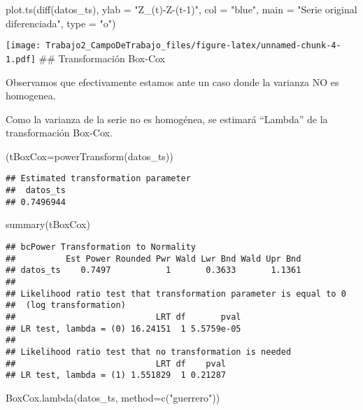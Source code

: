 \documentclass[
]{article}
\newenvironment{Shaded}{\begin{snugshade}}{\end{snugshade}}
\newcommand{\AttributeTok}[1]{\textcolor[rgb]{0.77,0.63,0.00}{#1}}
\newcommand{\FunctionTok}[1]{\textcolor[rgb]{0.00,0.00,0.00}{#1}}
\newcommand{\NormalTok}[1]{#1}
\newcommand{\StringTok}[1]{\textcolor[rgb]{0.31,0.60,0.02}{#1}}
\begin{document}
\begin{Shaded}
\begin{Highlighting}[]
\FunctionTok{plot.ts}\NormalTok{(}\FunctionTok{diff}\NormalTok{(datos\_ts), }\AttributeTok{ylab =} \StringTok{"Z\_(t){-}Z{-}(t{-}1)"}\NormalTok{, }\AttributeTok{col =} \StringTok{"blue"}\NormalTok{, }
        \AttributeTok{main =} \StringTok{"Serie original diferenciada"}\NormalTok{, }\AttributeTok{type =} \StringTok{"o"}\NormalTok{)}
\end{Highlighting}
\end{Shaded}

\texttt{[image: Trabajo2\_CampoDeTrabajo\_files/figure-latex/unnamed-chunk-4-1.pdf]}
\#\# Transformación Box-Cox

Observamos que efectivamente estamos ante un caso donde la varianza NO
es homogenea.

Como la varianza de la serie no es homogénea, se estimará ``Lambda'' de
la transformación Box-Cox.

\begin{Shaded}
\begin{Highlighting}[]
\NormalTok{(}\AttributeTok{tBoxCox=}\FunctionTok{powerTransform}\NormalTok{(datos\_ts))}
\end{Highlighting}
\end{Shaded}

\begin{verbatim}
## Estimated transformation parameter 
##  datos_ts 
## 0.7496944
\end{verbatim}

\begin{Shaded}
\begin{Highlighting}[]
\FunctionTok{summary}\NormalTok{(tBoxCox)}
\end{Highlighting}
\end{Shaded}

\begin{verbatim}
## bcPower Transformation to Normality 
##          Est Power Rounded Pwr Wald Lwr Bnd Wald Upr Bnd
## datos_ts    0.7497           1       0.3633       1.1361
## 
## Likelihood ratio test that transformation parameter is equal to 0
##  (log transformation)
##                            LRT df       pval
## LR test, lambda = (0) 16.24151  1 5.5759e-05
## 
## Likelihood ratio test that no transformation is needed
##                            LRT df    pval
## LR test, lambda = (1) 1.551829  1 0.21287
\end{verbatim}

\begin{Shaded}
\begin{Highlighting}[]
\FunctionTok{BoxCox.lambda}\NormalTok{(datos\_ts, }\AttributeTok{method=}\FunctionTok{c}\NormalTok{(}\StringTok{"guerrero"}\NormalTok{))}
\end{Highlighting}
\end{Shaded}
\end{document}
